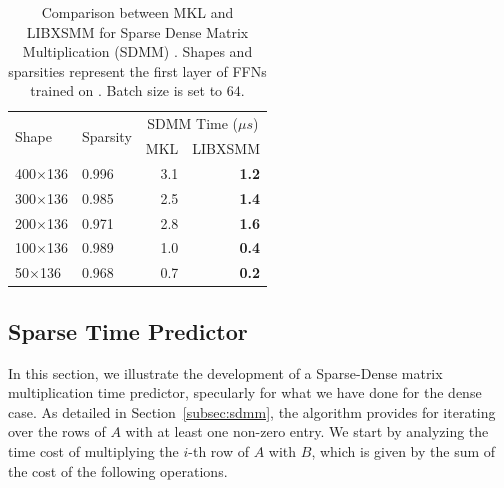 \begin{table}[htb]
	\centering
	\begin{tabular}{llrr}
		\toprule
		\multirow{2}{*}{Shape} &   	\multirow{2}{*}{Sparsity}&  \multicolumn{2}{c}{SDMM Time ($\mu s$)}\\
		\cmidrule{3-4}
		 & & MKL & LIBXSMM \\
		\midrule
		400$\times$136 &  0.996 &         3.1 &          \textbf{1.2} \\
 		300$\times$136 &  0.985 &         2.5 &          \textbf{1.4} \\
 		200$\times$136 &  0.971 &         2.8 &          \textbf{1.6} \\
 		100$\times$136 &  0.989 &         1.0 &          \textbf{0.4} \\
 		50$\times$136  &  0.968 &         0.7 &          \textbf{0.2} \\
 		\bottomrule
	\end{tabular}
	\caption{ Comparison between MKL and LIBXSMM for Sparse Dense Matrix Multiplication (SDMM)	. Shapes and sparsities represent the first layer of FFNs trained on \msn. Batch size is set to $64$.}
	\label{table:lib_vs_mkl_msn}
\end{table}


\subsection{Sparse Time Predictor}
\label{subsec:sptimepred}
In this section, we illustrate the development of a Sparse-Dense matrix multiplication time predictor, specularly for what we have done for the dense case.
As detailed in Section~\ref{subsec:sdmm}, the algorithm provides for iterating over the rows of $A$ with at least one non-zero entry. We start by analyzing the time cost of multiplying the $i$-th row of $A$ with $B$, which is given by the sum of the cost of the following operations. 

